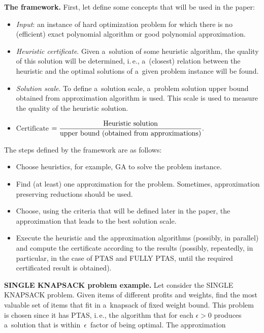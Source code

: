 \begin{multicols}{2}
\vspace*{-4pt}

\noindent
\textbf{The framework.} First, let define some concepts that
will be used in the paper:
\begin{itemize}
\item \textit{Input}: an instance of hard optimization problem
for which there is no (efficient) exact polynomial algorithm or good
polynomial approximation.
\item \textit{Heuristic certificate}. Given a~solution of some
heuristic algorithm, the quality of this
solution will be determined, i.\,e.,  a~(closest) relation between the
heuristic and the optimal
solutions of a~given problem instance will be found.
\item \textit{Solution scale}. To define a~solution scale,
a~problem solution upper
bound obtained from approximation algorithm is used.
This scale is used to measure the quality of the heuristic solution.
\item $\displaystyle
\mathrm{Certificate}$\linebreak
$=\displaystyle\frac{\displaystyle \mathrm{Heuristic\
solution}\mathstrut}{\displaystyle \mathrm{upper\ bound\ (obtained\ from\
approximations)}\mathstrut}.$
\end{itemize}

The steps defined by the framework are as follows:
\begin{itemize}
\item Choose heuristics, for example, GA
to solve the problem instance.
\item Find (at least) one approximation for the problem.
Sometimes, approximation preserving reductions should be used.
\item Choose, using the criteria that will be defined later in
the
paper, the approximation that leads to the best solution scale.
\item Execute the heuristic and the approximation algorithms
(possibly, in parallel) and compute the certificate according to the
results (possibly, repeatedly, in particular, in the case of
PTAS and {FULLY PTAS}, until the required certificated result is
obtained).
\end{itemize}

\noindent
\textbf{SINGLE KNAPSACK problem example.} Let consider the
{SINGLE KNAPSACK} problem. Given items of different profits and
weights, find the most valuable set of items that fit in a~knapsack
of fixed weight bound. This problem is chosen since it has
PTAS, i.\,e., the algorithm that for each $\epsilon > 0$
produces a~solution that is within~$\epsilon$~factor of being optimal. The
approximation\linebreak\vspace*{-12pt}


\end{multicols}
